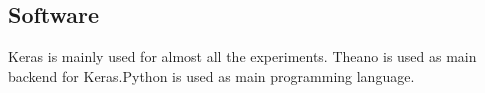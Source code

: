 \subsection{Software}
Keras \cite{chollet2015} is mainly used for almost all the experiments. Theano \cite{2016arXiv160502688short} is used as main backend for Keras.Python is used as main programming language.